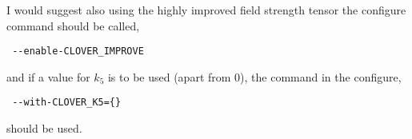 \documentclass[12pt]{article}
\begin{document}
I would suggest also using the highly improved field strength tensor the configure command should be called,
\begin{verbatim}
 --enable-CLOVER_IMPROVE
\end{verbatim}
and if a value for $k_5$ is to be used (apart from 0), the command in the configure,
\begin{verbatim}
 --with-CLOVER_K5={}
\end{verbatim}
should be used.
\end{document}
